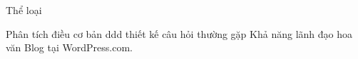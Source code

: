 Thể loại

Phân tích
điều cơ bản
ddd
thiết kế
câu hỏi thường gặp
Khả năng lãnh đạo
hoa văn
Blog tại WordPress.com.

